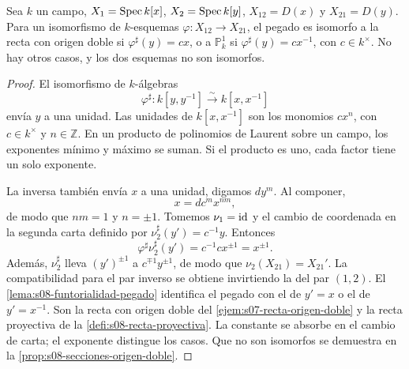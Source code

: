 \begin{prop}
\label{prop:s08-pegados-dos-rectas}
Sea $k$ un campo, $X_1=\operatorname{Spec} k[x]$, $X_2=\operatorname{Spec} k[y]$, $X_{12}=D(x)$ y $X_{21}=D(y)$. Para un isomorfismo de $k$-esquemas $\varphi\colon X_{12}\to X_{21}$, el pegado es isomorfo a la recta con origen doble si $\varphi^\sharp(y)=cx$, o a $\mathbb P_k^1$ si $\varphi^\sharp(y)=cx^{-1}$, con $c\in k^\times$. No hay otros casos, y los dos esquemas no son isomorfos.
\end{prop}
\begin{proof}
El isomorfismo de $k$-álgebras
\[
\varphi^\sharp\colon k[y,y^{-1}]\xrightarrow{\sim}k[x,x^{-1}]
\]
envía $y$ a una unidad. Las unidades de $k[x,x^{-1}]$ son los monomios $cx^n$, con $c\in k^\times$ y $n\in\mathbb Z$. En un producto de polinomios de Laurent sobre un campo, los exponentes mínimo y máximo se suman. Si el producto es uno, cada factor tiene un solo exponente.

La inversa también envía $x$ a una unidad, digamos $dy^m$. Al componer,
\[
x=dc^m x^{nm},
\]
de modo que $nm=1$ y $n=\pm1$. Tomemos $\nu_1=\operatorname{id}$ y el cambio de coordenada en la segunda carta definido por $\nu_2^\sharp(y')=c^{-1}y$. Entonces
\[
\varphi^\sharp\nu_2^\sharp(y')=c^{-1}cx^{\pm1}=x^{\pm1}.
\]
Además, $\nu_2^\sharp$ lleva $(y')^{\pm1}$ a $c^{\mp1}y^{\pm1}$, de modo que $\nu_2(X_{21})=X_{21}'$. La compatibilidad para el par inverso se obtiene invirtiendo la del par $(1,2)$. El \cref{lema:s08-funtorialidad-pegado} identifica el pegado con el de $y'=x$ o el de $y'=x^{-1}$. Son la recta con origen doble del \cref{ejem:s07-recta-origen-doble} y la recta proyectiva de la \cref{defi:s08-recta-proyectiva}. La constante se absorbe en el cambio de carta; el exponente distingue los casos. Que no son isomorfos se demuestra en la \cref{prop:s08-secciones-origen-doble}.
\end{proof}

